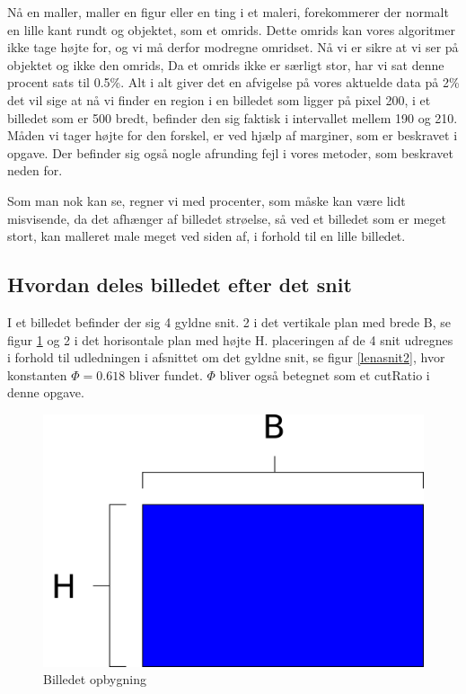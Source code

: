 Nå en maller, maller en figur eller en ting i et maleri, forekommerer der normalt en
lille kant rundt og objektet, som et omrids. Dette omrids kan vores
algoritmer ikke tage højte for, og vi må derfor modregne omridset. Nå vi
er sikre at vi ser på objektet og ikke den omrids, Da et omrids ikke er
særligt stor, har vi sat denne procent sats til 0.5\%. Alt i alt giver
det en afvigelse på vores aktuelde data på 2\% det vil sige at nå vi
finder en region i en billedet som ligger på pixel 200, i et billedet
som er 500 bredt, befinder den sig faktisk i intervallet mellem 190 og
210. Måden vi tager højte for den forskel, er ved hjælp af marginer, som
er beskravet i opgave. Der befinder sig også nogle afrunding fejl i
vores metoder, som beskravet neden for.

Som man nok kan se, regner vi med procenter, som måske kan være lidt
misvisende, da det afhænger af billedet strøelse, så ved et billedet som
er meget stort, kan malleret male meget ved siden af, i forhold til en
lille billedet.

\subsection{Hvordan deles billedet efter det snit}
I et billedet befinder der sig 4 gyldne snit. 2 i det vertikale plan med
brede B, se figur \ref{box} og 2 i det horisontale plan med højte H.
placeringen af de 4 snit udregnes i forhold til udledningen i afsnittet
om det gyldne snit, se figur \ref{lenasnit2}, hvor konstanten $\varPhi =
0.618$ bliver fundet. $\varPhi$ bliver også betegnet som et cutRatio i
denne opgave.

\begin{figure}[h]
	\begin{center}
		\includegraphics[scale=0.42,angle=0]{afsnit/vores_implementation/billeder/naiv_algoritme/path2407}
	\end{center}
	\caption[]{Billedet opbygning}
	\label{box}
\end{figure}

